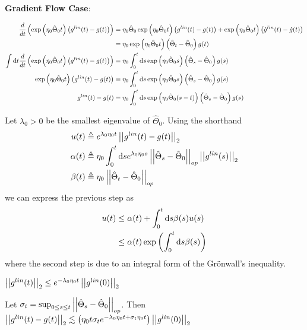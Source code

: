 \documentclass{article}
\begin{document}
\begin{appendices}
\textbf{Gradient Flow Case}:
\begin{compactenum}
	\item 
	\begin{align}
		\deriv{}{t}\lr{   \exp\lr{  \eta_0 \hat\Theta_0 t } \lr{ g^{lin}(t) - g(t) }    }
		&= \eta_0 \hat\Theta_0  \exp\lr{  \eta_0 \hat\Theta_0 t } \lr{ g^{lin}(t) - g(t) }
		+  \exp\lr{  \eta_0 \hat\Theta_0 t } \lr{ \dot g^{lin}(t) -\dot  g(t) } \\
		&= \eta_0  \exp\lr{  \eta_0 \hat\Theta_0 t } \lr{\hat\Theta_t - \hat\Theta_0} g(t) \\
		\int \mathrm{d}t \deriv{}{t} \lr{   \exp\lr{  \eta_0 \hat\Theta_0 t } \lr{ g^{lin}(t) - g(t) }    } 
		&= \eta_0  \int_{0}^t \mathrm{d}s   \exp\lr{  \eta_0 \hat\Theta_0 s } \lr{\hat\Theta_s - \hat\Theta_0} g(s) \\
		\exp\lr{  \eta_0 \hat\Theta_0 t } \lr{ g^{lin}(t) - g(t) } 
		&= \eta_0  \int_{0}^t \mathrm{d}s   \exp\lr{  \eta_0 \hat\Theta_0 s } \lr{\hat\Theta_s - \hat\Theta_0} g(s) \\
		g^{lin}(t) - g(t) 
		&= \eta_0  \int_{0}^t \mathrm{d}s   \exp\lr{  \eta_0 \hat\Theta_0 (s - t) } \lr{\hat\Theta_s - \hat\Theta_0} g(s) 
	\end{align}
	
	\item Let $\lambda_0 > 0$ be the smallest eigenvalue of $\hat\Theta_0$. Using the shorthand
	\begin{align}
		u(t) 
		&\triangleq e^{\lambda_0 \eta_0 t} \norm{g^{lin}(t) - g(t)} \\
		\alpha(t) 
		&\triangleq \eta_0 \int_0^t \mathrm{d}s e^{\lambda_0 \eta_0 s} \norm[op]{\hat\Theta_s - \hat\Theta_0} \norm{g^{lin}(s)} \\
		\beta(t)
		&\triangleq \eta_0 \norm[op]{\hat\Theta_t - \hat\Theta_0}
	\end{align}
	we can express the previous step as 
	\begin{align}
		u(t) &\leq \alpha(t) + \int_0^t \mathrm{d}s \beta(s) u(s) \\
		&\leq \alpha(t) \exp\lr{ \int_0^t \mathrm{d}s \beta(s)  }
	\end{align}
	where the second step is due to an integral form of the Gr\"{o}nwall's inequality. 
	
	\item $\norm{g^{lin}(t)} \leq e^{-\lambda_0 \eta_0 t} \norm{g^{lin}(0)}$
	
	\item Let $\sigma_t = \sup_{0 \leq s \leq t} \norm[op]{\hat\Theta_s - \hat\Theta_0}$. Then $\norm{g^{lin}(t) - g(t)} \lesssim \lr{  \eta_0 t \sigma_t e^{-\lambda_0 \eta_0 t + \sigma_t \eta_0 t}  } \norm{g^{lin}(0)}$ 
	

\end{compactenum}
\end{appendices}
\end{document}
